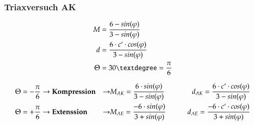 \begin{minipage}{0.3\linewidth}	
	\subsubsection{Triaxversuch AK}
	\begin{align*}
		M			&= \frac{6 - sin(\varphi)}{3 - sin(\varphi)} \\
		d			&= \frac{6 \cdot c`\cdot cos(\varphi)}{3 - sin(\varphi)} \\
		\Theta		&= 30° = \frac{\pi}{6} \\
	\end{align*}
\end{minipage}
\begin{minipage}{0.5\linewidth}
	\begin{align*}
		\Theta		&= - \frac{\pi}{6}
		\rightarrow \textbf{Kompression}
		&\rightarrow &M_{AK} = \frac{6 \cdot sin(\varphi)}{3 - sin(\varphi)}
		\qquad &d_{AK} = \frac{6 \cdot c`\cdot cos(\varphi)}{3 - sin(\varphi)} \\
		\Theta		&= + \frac{\pi}{6}
		\rightarrow \textbf{Extenssion}
		&\rightarrow &M_{AE} = \frac{- 6 \cdot sin(\varphi)}{3 + sin(\varphi)}
		\qquad &d_{AE} = \frac{- 6 \cdot c`\cdot cos(\varphi)}{3 + sin(\varphi)}
	\end{align*}
\end{minipage}
